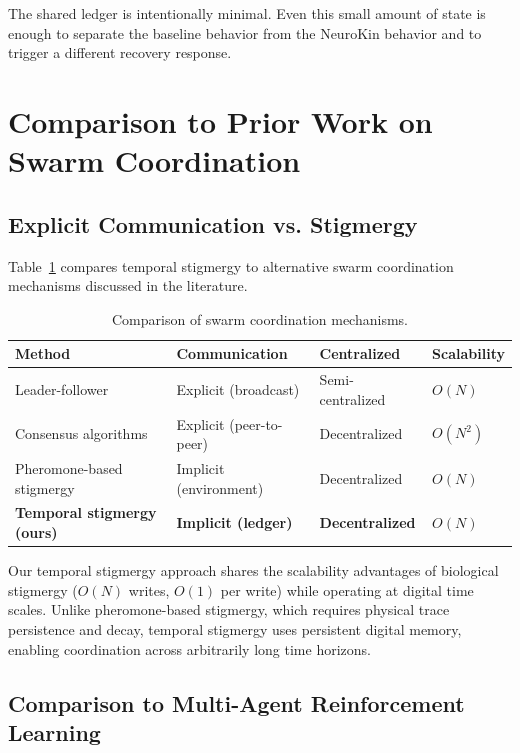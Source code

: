 \documentclass[12pt,a4paper,oneside]{report}
\begin{document}
The shared ledger is intentionally minimal. Even this small amount of state is enough to separate the baseline behavior from the NeuroKin behavior and to trigger a different recovery response.

\section{Comparison to Prior Work on Swarm Coordination}

\subsection{Explicit Communication vs. Stigmergy}

Table~\ref{tab:swarm_comparison_lit} compares temporal stigmergy to alternative swarm coordination mechanisms discussed in the literature.

\begin{table}[H]
\centering
\small
\setlength{\tabcolsep}{4pt}
\caption{Comparison of swarm coordination mechanisms.}
\label{tab:swarm_comparison_lit}
\begin{tabular}{>{\raggedright\arraybackslash}p{4.0cm} >{\raggedright\arraybackslash}p{4.0cm} >{\centering\arraybackslash}p{2.6cm} >{\centering\arraybackslash}p{2.6cm}}
\toprule
\textbf{Method} & \textbf{Communication} & \textbf{Centralized} & \textbf{Scalability} \\
\midrule
Leader-follower & Explicit (broadcast) & Semi-centralized & $O(N)$ \\
Consensus algorithms & Explicit (peer-to-peer) & Decentralized & $O(N^2)$ \\
Pheromone-based stigmergy & Implicit (environment) & Decentralized & $O(N)$ \\
\textbf{Temporal stigmergy (ours)} & \textbf{Implicit (ledger)} & \textbf{Decentralized} & \textbf{$O(N)$} \\
\bottomrule
\end{tabular}
\end{table}

Our temporal stigmergy approach shares the scalability advantages of biological stigmergy ($O(N)$ writes, $O(1)$ per write) while operating at digital time scales. Unlike pheromone-based stigmergy, which requires physical trace persistence and decay, temporal stigmergy uses persistent digital memory, enabling coordination across arbitrarily long time horizons.

\subsection{Comparison to Multi-Agent Reinforcement Learning}
\end{document}
